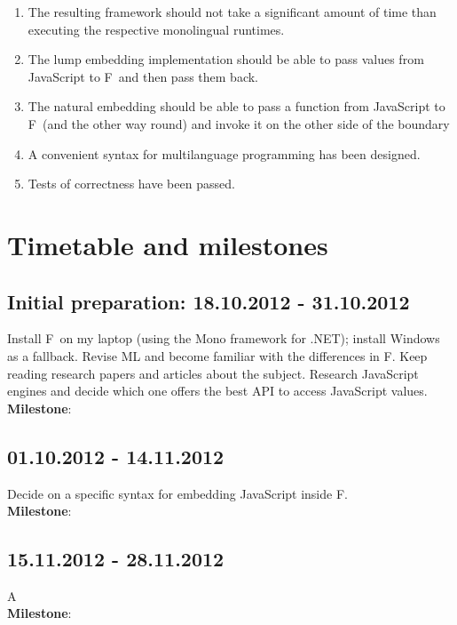 \documentclass[12pt,a4paper]{article} \usepackage{a4wide}
\newcommand{\fs}{F\nolinebreak\hspace{-.05em}\raisebox{.6ex}{\tiny\bf
    \#}}
\begin{document}
\begin{enumerate}

\item The resulting framework should not take a significant amount of
  time than executing the respective monolingual runtimes.

\item The lump embedding implementation should be able to pass values
  from JavaScript to \fs\ and then pass them back.

\item The natural embedding should be able to pass a function from
  JavaScript to \fs\ (and the other way round) and invoke it on the
  other side of the boundary

\item A convenient syntax for multilanguage programming has been
  designed.

\item Tests of correctness have been passed.

\end{enumerate}

\section{Timetable and milestones}

\subsection*{Initial preparation: 18.10.2012 - 31.10.2012}

Install \fs\ on my laptop (using the Mono framework for .NET); install
Windows as a fallback.  Revise ML and become familiar with the
differences in \fs.  Keep reading research papers and articles about
the subject.  Research JavaScript engines and decide which one offers
the best API to access JavaScript values.
\\{\bf Milestone}:

\subsection*{01.10.2012 - 14.11.2012 }
Decide on a specific syntax for embedding JavaScript inside \fs.
\\{\bf Milestone}:

\subsection*{15.11.2012 - 28.11.2012}
A
\\{\bf Milestone}:
\end{document}
